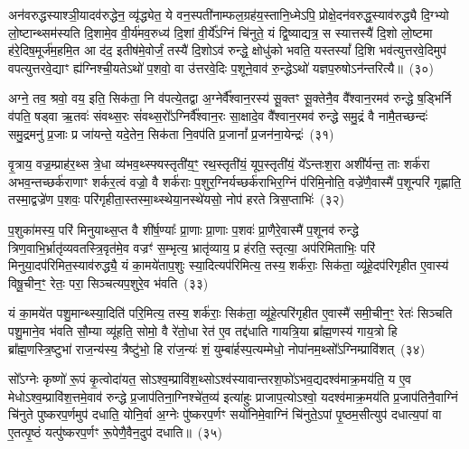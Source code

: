 अन॑वरुद्धस्याश्ञी॒यादव॑रुद्धेन॒ व्यृ॑द्ध्येत॒ ये वन॒स्पती॑नाम्फल॒ग्रह॑य॒स्तानि॒ध्मे\-ऽपि॒ प्रोक्षे॒दन॑वरुद्ध॒स्याव॑रुद्ध्यै दि॒ग्भ्यो लो॒ष्टान्थ्सम॑स्यति दि॒शामे॒व वी॒र्य॑मव॒रुध्य॑ दि॒शां वी॒र्ये᳚\-ऽग्निं चि॑नुते॒ यं द्वि॒ष्याद्यत्र॒ स स्यात्तस्यै॑ दि॒शो लो॒ष्टमा ह॑रे॒दिष॒मूर्ज॑म॒हमि॒त आ द॑द॒ इतीष॑मे॒वोर्जं॒ तस्यै॑ दि॒शो\-ऽव॑ रुन्द्धे॒ क्षोधु॑को भवति॒ यस्तस्यां᳚ दि॒शि भव॑त्युत्तरवे॒दिमुप॑ वपत्युत्तरवे॒द्याꣳ ह्य॑ग्निश्ची॒यते\-ऽथो॑ प॒शवो॒ वा उ॑त्तरवे॒दिः प॒शूने॒वाव॑ रु॒न्द्धे\-ऽथो॑ यज्ञप॒रुषो\-ऽन॑न्तरित्यै॥~(३०)

{\anuvakamend[{च॒ भ॒व॒त्ये॒ताव॒द्वै पुरु॑षे वी॒र्यं॑ यत्कृ॒ष्टञ्चाकृ॑ष्टं च॒ दिख्सीता॑ अग्नि॒चिदव॒ पञ्च॑विꣳशतिश्च}]}%

अग्ने॒ तव॒ श्रवो॒ वय॒ इति॒ सिक॑ता॒ नि व॑पत्ये॒तद्वा अ॒ग्नेर्वै᳚श्वान॒रस्य॑ सू॒क्तꣳ सू॒क्तेनै॒व वै᳚श्वान॒रमव॑ रुन्द्धे ष॒ड्भिर्नि व॑पति॒ षड्वा ऋ॒तवः॑ संवथ्स॒रः सं॑वथ्स॒रो᳚\-ऽग्निर्वै᳚श्वान॒रः सा॒क्षादे॒व वै᳚श्वान॒रमव॑ रुन्द्धे समु॒द्रं वै नामै॒तच्छन्दः॑ समु॒द्रमनु॑ प्र॒जाः प्र जा॑यन्ते॒ यदे॒तेन॒ सिक॑ता नि॒वप॑ति प्र॒जानां᳚ प्र॒जन॑ना॒येन्द्रः॑~(३१)

वृ॒त्राय॒ वज्र॒म्प्राह॑र॒थ्स त्रे॒धा व्य॑भव॒थ्स्फ्यस्तृती॑य॒ꣳ॒ रथ॒स्तृती॑यं॒ यूप॒स्तृती॑यं॒ ये᳚\-ऽन्तःश॒रा अशी᳚र्यन्त॒ ताः शर्क॑रा अभव॒न्तच्छर्क॑राणाꣳ शर्कर॒त्वं वज्रो॒ वै शर्क॑राः प॒शुर॒ग्निर्यच्छर्क॑राभिर॒ग्निं प॑रिमि॒नोति॒ वज्रे॑णै॒वास्मै॑ प॒शून्परि॑ गृह्णाति॒ तस्मा॒द्वज्रे॑ण प॒शवः॒ परि॑गृहीता॒स्तस्मा॒थ्स्थेया॒नस्थे॑यसो॒ नोप॑ हरते त्रिस॒प्ताभिः॑~(३२)

प॒शुका॑मस्य॒ परि॑ मिनुयाथ्स॒प्त वै शी॑र्\mbox{}ष॒ण्याः᳚ प्रा॒णाः प्रा॒णाः प॒शवः॑ प्रा॒णैरे॒वास्मै॑ प॒शूनव॑ रुन्द्धे त्रिण॒वाभि॒\-र्भ्रातृ॑व्यवतस्त्रि॒वृत॑मे॒व वज्रꣳ॑ स॒म्भृत्य॒ भ्रातृ॑व्याय॒ प्र ह॑रति॒ स्तृत्या॒ अप॑रिमिताभिः॒ परि॑ मिनुया॒दप॑रिमित॒स्याव॑रुद्ध्यै॒ यं का॒मये॑ताप॒शुः स्या॒दित्यप॑रिमित्य॒ तस्य॒ शर्क॑राः॒ सिक॑ता॒ व्यू॑हे॒दप॑रिगृहीत ए॒वास्य॑ विषू॒चीन॒ꣳ॒ रेतः॒ परा॒ सिञ्चत्यप॒शुरे॒व भ॑वति~(३३)

यं का॒मये॑त पशु॒मान्थ्स्या॒दिति॑ परि॒मित्य॒ तस्य॒ शर्क॑राः॒ सिक॑ता॒ व्यू॑हे॒त्परि॑गृहीत ए॒वास्मै॑ समी॒चीन॒ꣳ॒ रेतः॑ सिञ्चति पशु॒माने॒व भ॑वति सौ॒म्या व्यू॑हति॒ सोमो॒ वै रे॑तो॒धा रेत॑ ए॒व तद्द॑धाति गायत्रि॒या ब्रा᳚ह्म॒णस्य॑ गाय॒त्रो हि ब्रा᳚ह्म॒णस्त्रि॒ष्टुभा॑ राज॒न्य॑स्य॒ त्रैष्टु॑भो॒ हि रा॑ज॒न्यः॑ शं॒ युम्बा॑र्\mbox{}हस्प॒त्यम्मेधो॒ नोपा॑नम॒थ्सो᳚\-ऽग्निम्प्रावि॑शत्~(३४)

सो᳚\-ऽग्नेः कृष्णो॑ रू॒पं कृ॒त्वोदा॑यत॒ सो\-ऽश्व॒म्प्रावि॑श॒थ्सो\-ऽश्व॑स्यावान्तरश॒फो॑\-ऽभव॒द्यदश्व॑माक्र॒मय॑ति॒ य ए॒व मेधो\-ऽश्व॒म्प्रावि॑श॒त्तमे॒वाव॑ रुन्द्धे प्र॒जाप॑तिना॒ग्निश्चे॑त॒व्य॑ इत्या॑हुः प्राजाप॒त्यो\-ऽश्वो॒ यदश्व॑माक्र॒मय॑ति प्र॒जाप॑तिनै॒वाग्निं चि॑नुते पुष्करप॒र्णमुप॑ दधाति॒ योनि॒र्वा अ॒ग्नेः पु॑ष्करप॒र्णꣳ सयो॑निमे॒वाग्निं चि॑नुते॒\-ऽपां पृ॒ष्ठम॒सीत्युप॑ दधात्य॒पां वा ए॒तत्पृ॒ष्ठं यत्पु॑ष्करप॒र्णꣳ रू॒पेणै॒वैन॒दुप॑ दधाति॥~(३५)

